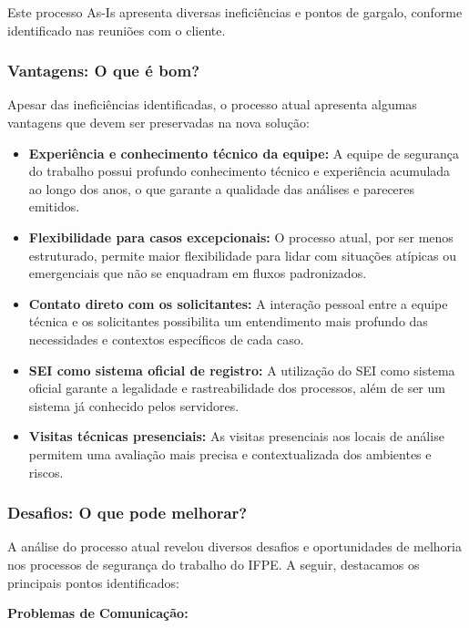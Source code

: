 \documentclass[12pt,a4paper]{article}
\begin{document}
Este processo As-Is apresenta diversas ineficiências e pontos de gargalo, conforme identificado nas reuniões com o cliente.

\subsubsection{Vantagens: O que é bom?}
Apesar das ineficiências identificadas, o processo atual apresenta algumas vantagens que devem ser preservadas na nova solução:

\begin{itemize}
    \item \textbf{Experiência e conhecimento técnico da equipe:} A equipe de segurança do trabalho possui profundo conhecimento técnico e experiência acumulada ao longo dos anos, o que garante a qualidade das análises e pareceres emitidos.
    
    \item \textbf{Flexibilidade para casos excepcionais:} O processo atual, por ser menos estruturado, permite maior flexibilidade para lidar com situações atípicas ou emergenciais que não se enquadram em fluxos padronizados.
    
    \item \textbf{Contato direto com os solicitantes:} A interação pessoal entre a equipe técnica e os solicitantes possibilita um entendimento mais profundo das necessidades e contextos específicos de cada caso.
    
    \item \textbf{SEI como sistema oficial de registro:} A utilização do SEI como sistema oficial garante a legalidade e rastreabilidade dos processos, além de ser um sistema já conhecido pelos servidores.
    
    \item \textbf{Visitas técnicas presenciais:} As visitas presenciais aos locais de análise permitem uma avaliação mais precisa e contextualizada dos ambientes e riscos.
\end{itemize}

\subsubsection{Desafios: O que pode melhorar?}
A análise do processo atual revelou diversos desafios e oportunidades de melhoria nos processos de segurança do trabalho do IFPE. A seguir, destacamos os principais pontos identificados:

\textbf{Problemas de Comunicação:}
\end{document}
